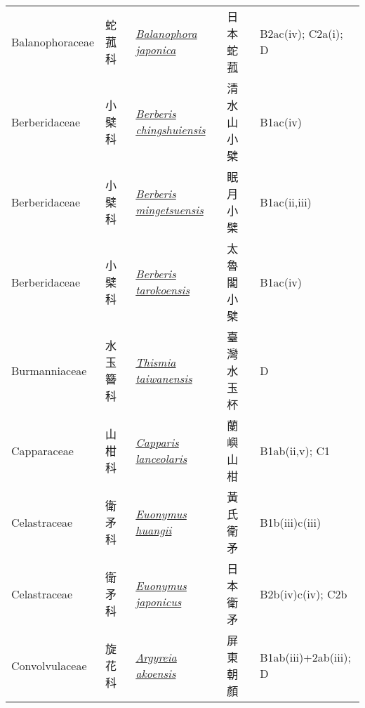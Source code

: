 {\begin{longtable}{L{2.5cm}L{2cm}L{5cm}L{2.5cm}L{3cm}}
    Balanophoraceae & 蛇菰科 & \href{http://www.theplantlist.org/tpl1.1/search?q=Balanophora+japonica}{\textit{Balanophora japonica} } & 日本蛇菰 & B2ac(iv); C2a(i); D    \\
    Berberidaceae & 小檗科 & \href{http://www.theplantlist.org/tpl1.1/search?q=Berberis+chingshuiensis}{\textit{Berberis chingshuiensis} } & 清水山小檗 & B1ac(iv)    \\
    Berberidaceae & 小檗科 & \href{http://www.theplantlist.org/tpl1.1/search?q=Berberis+mingetsuensis}{\textit{Berberis mingetsuensis} } & 眠月小檗 & B1ac(ii,iii)    \\
    Berberidaceae & 小檗科 & \href{http://www.theplantlist.org/tpl1.1/search?q=Berberis+tarokoensis}{\textit{Berberis tarokoensis} } & 太魯閣小檗 & B1ac(iv)    \\
    Burmanniaceae & 水玉簪科 & \href{http://www.theplantlist.org/tpl1.1/search?q=Thismia+taiwanensis}{\textit{Thismia taiwanensis} } & 臺灣水玉杯 & D    \\
    Capparaceae & 山柑科 & \href{http://www.theplantlist.org/tpl1.1/search?q=Capparis+lanceolaris}{\textit{Capparis lanceolaris} } & 蘭嶼山柑 & B1ab(ii,v); C1    \\
    Celastraceae & 衛矛科 & \href{http://www.theplantlist.org/tpl1.1/search?q=Euonymus+huangii}{\textit{Euonymus huangii} } & 黃氏衛矛 & B1b(iii)c(iii)    \\
    Celastraceae & 衛矛科 & \href{http://www.theplantlist.org/tpl1.1/search?q=Euonymus+japonicus}{\textit{Euonymus japonicus} } & 日本衛矛 & B2b(iv)c(iv); C2b    \\
    Convolvulaceae & 旋花科 & \href{http://www.theplantlist.org/tpl1.1/search?q=Argyreia+akoensis}{\textit{Argyreia akoensis} } & 屏東朝顏 & B1ab(iii)+2ab(iii); D    \\

\end{longtable}}
